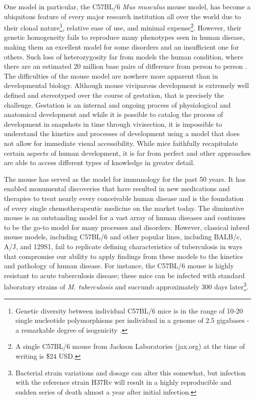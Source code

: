 One model in particular, the C57BL/6 \textit{Mus musculus} mouse model, has become a ubiquitous feature of every major research institution all over the world due to their clonal nature\footnote{Genetic diversity between individual C57BL/6 mice is in the range of 10-20 single nucleotide polymorphisms per individual in a genome of 2.5 gigabases - a remarkable degree of isogenicity \citep{Bryant2011, Sarsani2019}.}, relative ease of use, and minimal expense\footnote{A single C57BL/6 mouse from Jackson Laboratories (jax.org) at the time of writing is \$24 USD.}. However, their genetic homogeneity fails to reproduce many phenotypes seen in human disease, making them an excellent model for some disorders and an insufficient one for others. Such loss of heterozygosity far from models the human condition, where there are an estimated 20 million base pairs of difference from person to person \citep{Genomes2015}. The difficulties of the mouse model are nowhere more apparent than in developmental biology. Although mouse viviparous development is extremely well defined and stereotyped over the course of gestation, that is precisely the challenge. Gestation is an internal and ongoing process of physiological and anatomical development and while it is possible to catalog the process of development in snapshots in time through vivisection, it is impossible to understand the kinetics and processes of development using a model that does not allow for immediate visual accessibility. While mice faithfully recapitulate certain aspects of human development, it is far from perfect and other approaches are able to access different types of knowledge in greater detail.

The mouse has served as the model for immunology for the past 50 years. It has enabled monumental discoveries that have resulted in new medications and therapies to treat nearly every conceivable human disease and is the foundation of every single chemotherapeutic medicine on the market today. The diminutive mouse is an outstanding model for a vast array of human diseases and continues to be the go-to model for many processes and disorders. However, classical inbred mouse models, including C57BL/6 and other popular lines, including BALB/c, A/J, and 129S1, fail to replicate defining characteristics of tuberculosis in ways that compromise our ability to apply findings from these models to the kinetics and pathology of human disease. For instance, the C57BL/6 mouse is highly resistant to acute tuberculosis disease; these mice can be infected with standard laboratory strains of \textit{M. tuberculosis} and succumb approximately 300 days later\footnote{Bacterial strain variations and dosage can alter this somewhat, but infection with the reference strain H37Rv will result in a highly reproducible and sudden series of death almost a year after initial infection.}.

